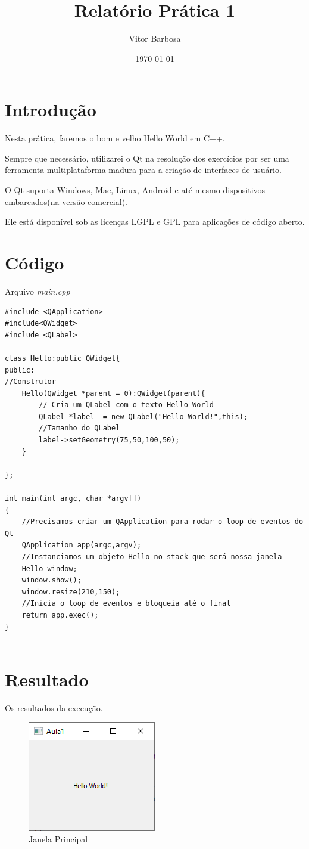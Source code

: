 \documentclass[12pt,a4paper]{article}
\title{Relatório Prática 1}
\author{Vitor Barbosa}
\date{\today}
\begin{document}
\maketitle
\section{Introdução}
Nesta prática, faremos o bom e velho Hello World em C++. 

Sempre que necessário, utilizarei o Qt na resolução dos exercícios por ser uma ferramenta multiplataforma madura para a criação 
de interfaces de usuário. 

O Qt suporta Windows, Mac, Linux, Android e até mesmo dispositivos embarcados(na versão comercial).

Ele está disponível sob as licenças LGPL e GPL para aplicações de código aberto.
\section{Código}
Arquivo \emph{main.cpp}
\begin{verbatim}
#include <QApplication>
#include<QWidget>
#include <QLabel>

class Hello:public QWidget{
public:
//Construtor
    Hello(QWidget *parent = 0):QWidget(parent){
        // Cria um QLabel com o texto Hello World
        QLabel *label  = new QLabel("Hello World!",this);
        //Tamanho do QLabel
        label->setGeometry(75,50,100,50);
    }

};

int main(int argc, char *argv[])
{
    //Precisamos criar um QApplication para rodar o loop de eventos do Qt
    QApplication app(argc,argv);
    //Instanciamos um objeto Hello no stack que será nossa janela
    Hello window;
    window.show();
    window.resize(210,150);
    //Inicia o loop de eventos e bloqueia até o final
    return app.exec();
}
    
\end{verbatim}
\section{Resultado}
Os resultados da execução.
\begin{figure}[h]
    \centering
    \includegraphics{janela}
    \caption{Janela Principal}
    \label{}
\end{figure}
\end{document}
